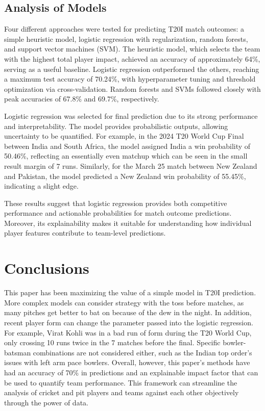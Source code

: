 \documentclass{article}[12pt]
\begin{document}
\subsection{Analysis of Models}

Four different approaches were tested for predicting T20I match outcomes: a simple heuristic model, logistic regression with regularization, random forests, and support vector machines (SVM). The heuristic model, which selects the team with the highest total player impact, achieved an accuracy of approximately 64\%, serving as a useful baseline. Logistic regression outperformed the others, reaching a maximum test accuracy of 70.24\%, with hyperparameter tuning and threshold optimization via cross-validation. Random forests and SVMs followed closely with peak accuracies of 67.8\% and 69.7\%, respectively.

Logistic regression was selected for final prediction due to its strong performance and interpretability. The model provides probabilistic outputs, allowing uncertainty to be quantified. For example, in the 2024 T20 World Cup Final between India and South Africa, the model assigned India a win probability of 50.46\%, reflecting an essentially even matchup which can be seen in the small result margin of 7 runs. Similarly, for the March 25 match between New Zealand and Pakistan, the model predicted a New Zealand win probability of 55.45\%, indicating a slight edge. 

These results suggest that logistic regression provides both competitive performance and actionable probabilities for match outcome predictions. Moreover, its explainability makes it suitable for understanding how individual player features contribute to team-level predictions.


\section{Conclusions}

This paper has been maximizing the value of a simple model in T20I prediction. More complex models can consider strategy with the toss before matches, as many pitches get better to bat on because of the dew in the night. \parencite{krishnaswamy_2022_the} In addition, recent player form can change the parameter passed into the logistic regression. For example, Virat Kohli was in a bad run of form during the T20 World Cup, only crossing 10 runs twice in the 7 matches before the final. Specific bowler-batsman combinations are not considered either, such as the Indian top order's issues with left arm pace bowlers.\parencite{iyer_2023_why} Overall, however, this paper's methods have had an accuracy of 70\% in predictions and an explainable impact factor that can be used to quantify team performance. This framework can streamline the analysis of cricket and pit players and teams against each other objectively through the power of data.
\end{document}
